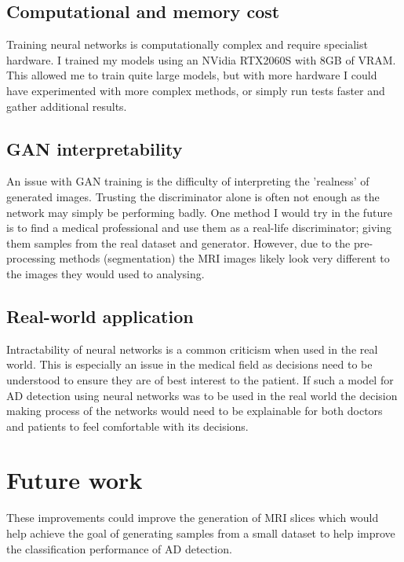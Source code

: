 \documentclass[
    author={Kai Hulme},
    supervisor={Dr Jon Bird},
    degree={BSc},
    title={Generative Adversarial Networks as an Augmentation Technique},
    subtitle={for Alzheimer's Disease Detection in MRI Volumes},
    type={Research},
    year={2021} 
]{dissertation}
\begin{document}
\subsection{Computational and memory cost}

Training neural networks is computationally complex and require specialist hardware. I trained my models using an NVidia RTX2060S with 8GB of VRAM. This allowed me to train quite large models, but with more hardware I could have experimented with more complex methods, or simply run tests faster and gather additional results.

\subsection{GAN interpretability}

An issue with GAN training is the difficulty of interpreting the 'realness' of generated images. Trusting the discriminator alone is often not enough as the network may simply be performing badly. One method I would try in the future is to find a medical professional and use them as a real-life discriminator; giving them samples from the real dataset and generator. However, due to the pre-processing methods (segmentation) the MRI images likely look very different to the images they would used to analysing.

\subsection{Real-world application}

Intractability of neural networks is a common criticism when used in the real world. This is especially an issue in the medical field as decisions need to be understood to ensure they are of best interest to the patient. If such a model for AD detection using neural networks was to be used in the real world the decision making process of the networks would need to be explainable for both doctors and patients to feel comfortable with its decisions.


\section{Future work}

These improvements could improve the generation of MRI slices which would help achieve the goal of generating samples from a small dataset to help improve the classification performance of AD detection.
\end{document}
